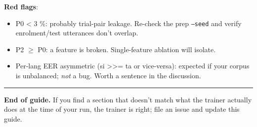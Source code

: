 \documentclass[10pt,a4paper]{article}
\begin{document}
\textbf{Red flags}:
\begin{itemize}[leftmargin=*,itemsep=2pt]
  \item P0 < 3 \%: probably trial-pair leakage. Re-check the prep \texttt{--seed} and verify enrolment/test utterances don't overlap.
  \item P2 $\geq$ P0: a feature is broken. Single-feature ablation will isolate.
  \item Per-lang EER asymmetric (si >>= ta or vice-versa): expected if your corpus is unbalanced; \textit{not} a bug. Worth a sentence in the discussion.
\end{itemize}

\vspace{0.5em}\hrule\vspace{0.5em}

\textbf{End of guide.} If you find a section that doesn't match what the trainer actually does at the time of your run, the trainer is right; file an issue and update this guide.
\end{document}
